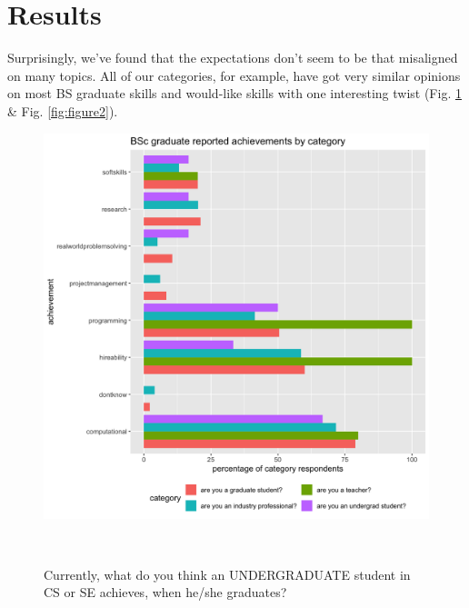 \documentclass{sigchi}
\begin{document}
%

\section{Results}
Surprisingly, we've found that the expectations don't seem to be that misaligned on many topics. All of our categories, for example, have got very similar opinions on most BS graduate skills and would-like skills with one interesting twist (Fig. \ref{fig:figure1} \& Fig. \ref{fig:figure2}).

\begin{figure}
 \includegraphics[scale=0.2]{../data-analysis/plots_output/BSc_graduate_reported_achievements_by_category.png}
 \caption{Currently, what do you think an UNDERGRADUATE student in CS or SE achieves, when he/she graduates?}~\label{fig:figure1}
\end{figure}
\end{document}
